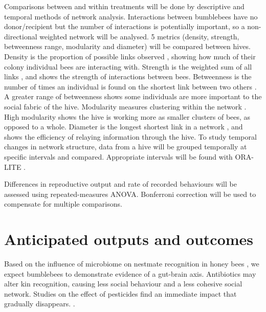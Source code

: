 \documentclass[11pt]{article} %
\begin{document}
            Comparisons between and within treatments will be done by descriptive and temporal methods of network analysis.
            Interactions between bumblebees have no donor/recipient but the number of interactions is potentially important,
            so a non-directional weighted network will be analysed.
            5 metrics (density, strength, betweenness range, modularity and diameter)
            will be compared between hives.
            Density is the proportion of possible links observed
            \parencite{sosa2020network},
            showing how much of their colony individual bees are interacting with.
            Strength is the weighted sum of all links
            \parencite{sosa2020network},
            and shows the strength of interactions between bees.
            Betweenness is the number of times an individual is found on the shortest link between two others
            \parencite{sosa2020network}.
            A greater range of betweenness shows some individuals are more important to the social fabric of the hive.
            Modularity measures clustering within the network
            \parencite{sosa2020network}.
            High modularity shows the hive is working more as smaller clusters of bees,
            as opposed to a whole.
            Diameter is the longest shortest link in a network
            \parencite{sosa2020network},
            and shows the efficiency of relaying information through the hive.
            To study temporal changes in network structure,
            data from a hive will be grouped temporally at specific intervals and compared.
            Appropriate intervals will be found with ORA-LITE
            \parencite{carley2014ora}.

            Differences in reproductive output and rate of recorded behaviours
            will be assessed using repeated-measures ANOVA.
            Bonferroni correction will be used to compensate for multiple comparisons.
        
    \section{Anticipated outputs and outcomes}
        Based on the influence of microbiome on nestmate recognition in honey bees
        \parencite{vernier2020gut}, we expect bumblebees to demonstrate evidence of a gut-brain axis.
        Antibiotics may alter kin recognition,
        causing less social behaviour and a less cohesive social network.
        Studies on the effect of pesticides find an immediate impact that gradually disappears.
        \parencite{crall2018neonicotinoid}.
\end{document}
